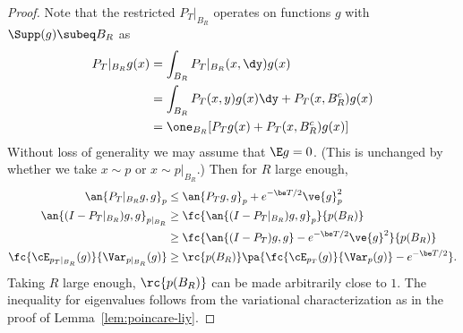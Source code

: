 \begin{proof}
Note that the restricted $P_T|_{B_R}$ operates on functions $g$ with $\Supp(g)\subeq B_R$ as 
\begin{align}
P_T|_{B_R} g(x) &= \int_{B_R} P_T|_{B_R} (x,\dy) g(x)\\
&=\int_{B_R} P_T(x,y) g(x)\dy + P_T(x,B_R^c) g(x)\\
&= \one_{B_R} [P_Tg(x)  + P_T(x,B_R^c) g(x)]
\end{align}
Without loss of generality we may assume that $\E g=0$. (This is unchanged by whether we take $x\sim p$ or $x\sim p|_{B_R}$.)
Then for $R$ large enough, 
\begin{align}
\an{P_T|_{B_R} g, g}_p
& \le \an{P_Tg,g}_p + e^{-\be T/2}\ve{g}_p^2\\
\an{(I-P_T|_{B_R})g,g}_{p|_{B_R}} &\ge
\fc{\an{(I-P_T|_{B_R})g, g}_p}{p(B_R)}\\
&\ge \fc{\an{(I-P_T)g,g} - e^{-\be T/2}\ve{g}^2}{p(B_R)}\\
\fc{\cE_{p_T|_{B_R}}(g)}{\Var_{p|_{B_R}}(g)}
& \ge \rc{p(B_R)}\pa{\fc{\cE_{p_T}(g)}{\Var_{p}(g)} - e^{-\be T/2}}.
\end{align}
Taking $R$ large enough, $\rc{p(B_R)}$ can be made arbitrarily close to $1$. 
The inequality for eigenvalues follows from the variational characterization as in the proof of Lemma~\ref{lem:poincare-liy}.
\end{proof}
